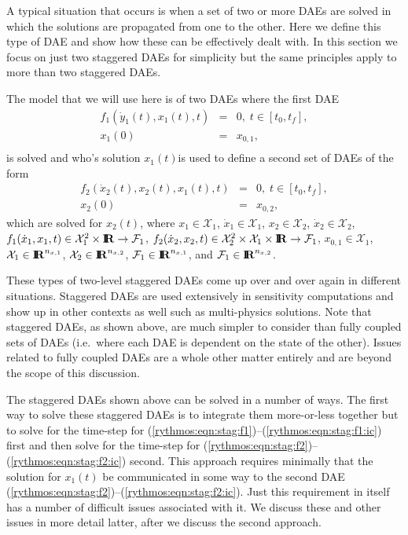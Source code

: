 \documentclass[pdf,ps2pdf,11pt]{SANDreport}
\begin{document}
A typical situation that occurs is when a set of two or more DAEs are solved
in which the solutions are propagated from one to the other.  Here we define
this type of DAE and show how these can be effectively dealt with.  In this
section we focus on just two staggered DAEs for simplicity but the same
principles apply to more than two staggered DAEs.

The model that we will use here is of two DAEs where the first DAE
%
\begin{eqnarray}
%
f_1(\dot{y}_1(t),x_1(t),t) & = & 0,
\; t \in \left[ t_0, t_f \right], \label{rythmos:eqn:stag:f1} \\
x_1(0) & = & x_{0,1}, \label{rythmos:eqn:stag:f1:ic} \\
%
\end{eqnarray}
%
is solved and who's solution $x_1(t)$is used to define a second set of DAEs of
the form
%
\begin{eqnarray}
%
f_2(\dot{x}_2(t),x_2(t),x_1(t),t) & = & 0,
\; t \in \left[ t_0, t_f \right], \label{rythmos:eqn:stag:f2} \\
x_2(0) & = & x_{0,2}, \label{rythmos:eqn:stag:f2:ic}
%
\end{eqnarray}
%
which are solved for $x_2(t)$, where $x_1\in\mathcal{X}_1$,
$\dot{x}_1\in\mathcal{X}_1$, $x_2\in\mathcal{X}_2$,
$\dot{x}_2\in\mathcal{X}_2$, $f_1(\dot{x}_1,x_1,t) {}\in {}\mathcal{X}_1^2
{}\times {}\mbox{\textbf{I}}\hspace{-0.6ex}\mbox{\textbf{R}} {}\rightarrow {}\mathcal{F}_1$, $f_2(\dot{x}_2,x_2,t) {}\in
{}\mathcal{X}_2^2 {}\times {}\mathcal{X}_1 {}\times {}\mbox{\textbf{I}}\hspace{-0.6ex}\mbox{\textbf{R}} {}\rightarrow
{}\mathcal{F}_1$, $x_{0,1}\in\mathcal{X}_1$, $\mathcal{X}_1 {}\in
{}\mbox{\textbf{I}}\hspace{-0.6ex}\mbox{\textbf{R}}^{n_{x,1}}$, $\mathcal{X}_2 {}\in {}\mbox{\textbf{I}}\hspace{-0.6ex}\mbox{\textbf{R}}^{n_{x,2}}$, $\mathcal{F}_1 {}\in
{}\mbox{\textbf{I}}\hspace{-0.6ex}\mbox{\textbf{R}}^{n_{x,1}}$, and $\mathcal{F}_1 {}\in {}\mbox{\textbf{I}}\hspace{-0.6ex}\mbox{\textbf{R}}^{n_{x,2}}$.

These types of two-level staggered DAEs come up over and over again in
different situations.  Staggered DAEs are used extensively in sensitivity
computations and show up in other contexts as well such as multi-physics
solutions.  Note that staggered DAEs, as shown above, are much simpler to
consider than fully coupled sets of DAEs (i.e.\ where each DAE is dependent on
the state of the other).  Issues related to fully coupled DAEs are a whole
other matter entirely and are beyond the scope of this discussion.

The staggered DAEs shown above can be solved in a number of ways.  The first
way to solve these staggered DAEs is to integrate them more-or-less together
but to solve for the time-step for
(\ref{rythmos:eqn:stag:f1})--(\ref{rythmos:eqn:stag:f1:ic}) first and then
solve for the time-step for
(\ref{rythmos:eqn:stag:f2})--(\ref{rythmos:eqn:stag:f2:ic}) second.  This
approach requires minimally that the solution for $x_1(t)$ be communicated in
some way to the second DAE
(\ref{rythmos:eqn:stag:f2})--(\ref{rythmos:eqn:stag:f2:ic}).  Just this
requirement in itself has a number of difficult issues associated with it.  We
discuss these and other issues in more detail latter, after we discuss the
second approach.
\end{document}
